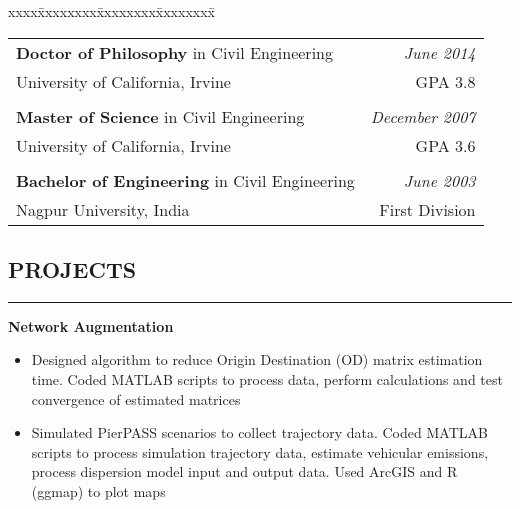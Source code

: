 \documentclass[10pt,a4]{article}
\def\mydot{\textcolor{deep_blue}{\rule{0.75ex}{0.75ex}}}
\begin{document}
\begin{small}
\begin{tabbing}
xxxx\=xxxxxxxx\=xxxxxxxx\=xxxxxxxx\=\kill
\>\begin{tabular*}{0.9\linewidth}{l@{\extracolsep{\fill}}r}

{\bf Doctor of Philosophy} {\color{gray}in Civil Engineering} & {\it \color{gray} June 2014}\\
{University of California, Irvine} & GPA 3.8  \\
\vspace{-0.25cm}
 & \\
 
{\bf Master of Science} {\color{gray}in Civil Engineering} & {\it \color{gray} December 2007}\\
{University of California, Irvine} &  GPA 3.6  \\
\vspace{-0.25cm}
 & \\

{\bf Bachelor of Engineering} {\color{gray}in Civil Engineering} & {\it \color{gray} June 2003}\\
{Nagpur University, India} & First Division

\end{tabular*}
\end{tabbing}


\vspace{-0.75cm}
\subsection*{\color{dark_blue}PROJECTS}
\vspace{-0.15cm}
\hrule
\vspace{0.1cm}

{\bf {\color{drkgray} Network Augmentation}}
\begin{itemize}
\item[\mydot] Designed algorithm to reduce Origin Destination (OD) matrix estimation time. Coded MATLAB scripts to process data, perform calculations and test convergence of estimated matrices
\end{itemize}

\begin{itemize}
\item[\mydot] Simulated PierPASS scenarios to collect trajectory data. Coded MATLAB scripts to process simulation trajectory data, estimate vehicular emissions, process dispersion model input and output data. Used ArcGIS and R (ggmap) to plot maps
\end{itemize}


\end{small}
\end{document}

